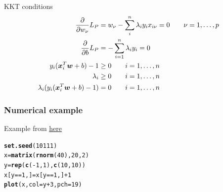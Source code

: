 \documentclass[aspectratio=169]{beamer}\usepackage[]{graphicx}\usepackage[]{xcolor}
\makeatletter
\newcommand{\hlnum}[1]{\textcolor[rgb]{0.686,0.059,0.569}{#1}}%
\newcommand{\hlopt}[1]{\textcolor[rgb]{0,0,0}{#1}}%
\newcommand{\hldef}[1]{\textcolor[rgb]{0.345,0.345,0.345}{#1}}%
\newcommand{\hlkwb}[1]{\textcolor[rgb]{0.69,0.353,0.396}{#1}}%
\newcommand{\hlkwc}[1]{\textcolor[rgb]{0.333,0.667,0.333}{#1}}%
\newcommand{\hlkwd}[1]{\textcolor[rgb]{0.737,0.353,0.396}{\textbf{#1}}}%
\newenvironment{kframe}{%
 \def\at@end@of@kframe{}%
 \ifinner\ifhmode%
  \def\at@end@of@kframe{\end{minipage}}%
  \begin{minipage}{\columnwidth}%
 \fi\fi%
 \def\FrameCommand##1{\hskip\@totalleftmargin \hskip-\fboxsep
 \colorbox{shadecolor}{##1}\hskip-\fboxsep
     \hskip-\linewidth \hskip-\@totalleftmargin \hskip\columnwidth}%
 \MakeFramed {\advance\hsize-\width
   \@totalleftmargin\z@ \linewidth\hsize
   \@setminipage}}%
 {\par\unskip\endMakeFramed%
 \at@end@of@kframe}
\newenvironment{knitrout}{}{} %
\makeatother
\begin{document}
\begin{frame}{KKT conditions}
    \begin{align*}
        \frac{\partial}{\partial w_\nu}L_P &=
        w_\nu-\sum_{i}^n\lambda_iy_ix_{i\nu}=0
        \qquad\nu=1,\ldots,p \\
        \frac{\partial}{\partial b}L_P &=
        -\sum_{i=1}^n \lambda_iy_i = 0 \\
        y_i(\bm{x}_i^T\bm{w}+b)-1 &\geq 0\qquad i=1,\ldots,n \\
        \lambda_i &\geq 0\qquad i=1,\ldots,n \\
        \lambda_i(y_i(\bm{x}_i^T\bm{w}+b)-1) &=0\qquad i=1,\ldots,n \\
    \end{align*}
\end{frame}


\begin{frame}[fragile]\frametitle{Numerical example}
Example from \href{https://www.datacamp.com/tutorial/support-vector-machines-r}{here}
\vfill
\begin{knitrout}
\color{fgcolor}\begin{kframe}
\begin{alltt}
\hlkwd{set.seed}\hldef{(}\hlnum{10111}\hldef{)}
\hldef{x} \hlkwb{=} \hlkwd{matrix}\hldef{(}\hlkwd{rnorm}\hldef{(}\hlnum{40}\hldef{),} \hlnum{20}\hldef{,} \hlnum{2}\hldef{)}
\hldef{y} \hlkwb{=} \hlkwd{rep}\hldef{(}\hlkwd{c}\hldef{(}\hlopt{-}\hlnum{1}\hldef{,} \hlnum{1}\hldef{),} \hlkwd{c}\hldef{(}\hlnum{10}\hldef{,} \hlnum{10}\hldef{))}
\hldef{x[y} \hlopt{==} \hlnum{1}\hldef{,]} \hlkwb{=} \hldef{x[y} \hlopt{==} \hlnum{1}\hldef{,]} \hlopt{+} \hlnum{1}
\hlkwd{plot}\hldef{(x,} \hlkwc{col} \hldef{= y} \hlopt{+} \hlnum{3}\hldef{,} \hlkwc{pch} \hldef{=} \hlnum{19}\hldef{)}
\end{alltt}
\end{kframe}
\end{knitrout}
\end{frame}

\end{document}
